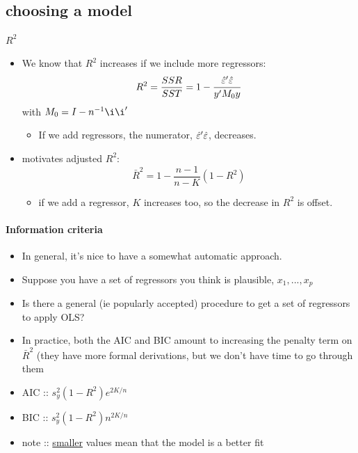 \subsection{choosing a model}

\paragraph{$R^2$}
\begin{itemize}
\item We know that $R^2$ increases if we include more regressors:
  \[R^2 = \frac{SSR}{SST} = 1 - \frac{\hat{\varepsilon}'\hat{\varepsilon}}{y'M_0y}\]
  with $M_0 = I - n^{-1} \i \i'$
\begin{itemize}
\item If we add regressors, the numerator,
  $\hat{\varepsilon}'\hat{\varepsilon}$, decreases.
\end{itemize}
\item motivates adjusted $R^2$:
  \[ \bar{R}^2 = 1 - \frac{n-1}{n-K}(1-R^2)\]
\begin{itemize}
\item if we add a regressor, $K$ increases too, so the decrease in
  $R^2$ is offset.
\end{itemize}
\end{itemize}

\paragraph{Information criteria}
\begin{itemize}
\item In general, it's nice to have a somewhat automatic approach.
\item Suppose you have a set of regressors you think is plausible,
  $x_1,...,x_p$
\item Is there a general (ie popularly accepted) procedure to get a
        set of regressors to apply OLS?
\item In practice, both the AIC and BIC amount to increasing the
        penalty term on $\bar{R}^2$ (they have more formal
        derivations, but we don't have time to go through them
\item AIC :: $s^2_y (1 - R^2) e^{2K/n}$
\item BIC :: $s^2_y (1 - R^2) n^{2K/n}$
\item note :: \underline{smaller} values mean that the model is a better fit
\end{itemize}

